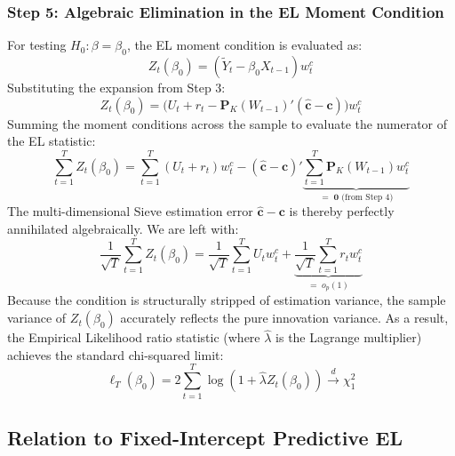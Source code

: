 \documentclass{article}
\begin{document}
\subsubsection*{Step 5: Algebraic Elimination in the EL Moment Condition}
For testing $H_0: \beta = \beta_0$, the EL moment condition is evaluated as:
\begin{equation}
    Z_t(\beta_0) = \left( \widetilde{Y}_t - \beta_0 X_{t-1} \right) w^c_t
\end{equation}
Substituting the expansion from Step 3:
\begin{equation}
    Z_t(\beta_0) = \Big( U_t + r_t - \bm{P}_K(W_{t-1})'(\widehat{\bm{c}} - \bm{c}) \Big) w^c_t
\end{equation}
Summing the moment conditions across the sample to evaluate the numerator of the EL statistic:
\begin{equation}
    \sum_{t=1}^T Z_t(\beta_0) = \sum_{t=1}^T (U_t + r_t) w^c_t - (\widehat{\bm{c}} - \bm{c})' \underbrace{\sum_{t=1}^T \bm{P}_K(W_{t-1}) w^c_t}_{=\; \bm{0} \text{ (from Step 4)}}
\end{equation}
The multi-dimensional Sieve estimation error $\widehat{\bm{c}} - \bm{c}$ is thereby perfectly annihilated algebraically. We are left with:
\begin{equation}
    \frac{1}{\sqrt{T}} \sum_{t=1}^T Z_t(\beta_0) = \frac{1}{\sqrt{T}} \sum_{t=1}^T U_t w^c_t + \underbrace{\frac{1}{\sqrt{T}} \sum_{t=1}^T r_t w^c_t}_{=\; o_p(1)}
\end{equation}
Because the condition is structurally stripped of estimation variance, the sample variance of $Z_t(\beta_0)$ accurately reflects the pure innovation variance. As a result, the Empirical Likelihood ratio statistic (where $\widehat{\lambda}$ is the Lagrange multiplier) achieves the standard chi-squared limit:
\begin{equation}
    \ell_T(\beta_0) = 2 \sum_{t=1}^T \log(1 + \widehat{\lambda} Z_t(\beta_0)) \xrightarrow{d} \chi^2_1
\end{equation}

\subsection{Relation to Fixed-Intercept Predictive EL}
\end{document}
